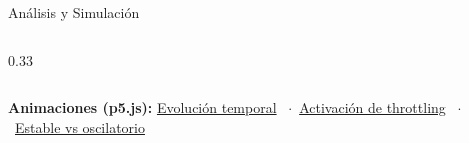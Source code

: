 \documentclass[aspectratio=169, 10pt]{beamer}
\begin{document}
\begin{frame}{Análisis y Simulación}
\begin{columns}[t]
\begin{column}{0.33\textwidth}
\begin{itemize}
      \end{itemize}
    \end{column}
  \end{columns}
  \vspace{8pt}
  \begin{columns}[c]
    \begin{column}{\textwidth}
      \small\textbf{Animaciones (p5.js):}\hspace{6pt}
      \scriptsize
      \href{https://editor.p5js.org/Alex-sklx0/sketches/7KqpJfRie}{Evolución temporal} \
      $\cdot$\ \href{https://editor.p5js.org/Alex-sklx0/sketches/fQWku9xab}{Activación de throttling} \
      $\cdot$\ \href{https://editor.p5js.org/Alex-sklx0/sketches/g4Q6W-0_4}{Estable vs oscilatorio}
    \end{column}
  \end{columns}
\end{frame}
\end{document}
